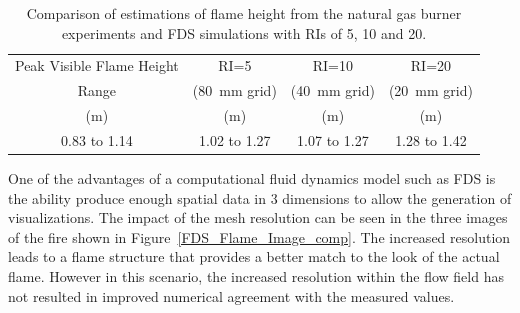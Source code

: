 \documentclass[twoside]{uocthesis}
\begin{document}
{\begin{table}[h]
  \small
  \centering
  \begin{tabular}{|c|c|c|c|}
    \hline Peak Visible Flame Height   	& RI=5       		& RI=10      		& RI=20  \\
    Range          						&  (80~mm grid)  	&  (40~mm grid)  	&  (20~mm grid)  \\
    (m)     							& (m) 				& (m) 				& (m)  			 \\ 
    \hline 0.83 to 1.14         		& 1.02 to 1.27      & 1.07 to 1.27      & 1.28 to 1.42   \\
    \hline
  \end{tabular}
  \caption[Comparison of estimations of flame height from the natural gas burner experiments and FDS simulations with RIs of 5, 10 and 20.]{Comparison of estimations of flame height from the natural gas burner experiments and FDS simulations with RIs of 5, 10 and 20.}
  \label{tab:FDS_FH}
\end{table}

One of the advantages of a computational fluid dynamics model such as FDS is the ability produce enough spatial data in 3 dimensions to allow the generation of visualizations.  The impact of the mesh resolution can be seen in the three images of the fire shown in Figure~\ref{FDS_Flame_Image_comp}.  The increased resolution leads to a flame structure that provides a better match to the look of the actual flame.  However in this scenario, the increased resolution within the flow field has not resulted in improved numerical agreement with the measured values.

}
\end{document}

